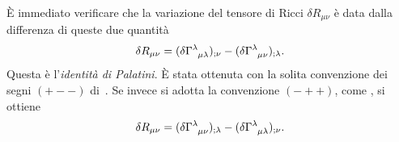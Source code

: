 È immediato verificare che la variazione del tensore di Ricci
$\delta R_{\mu\nu}$ è data dalla differenza di queste due quantità
\begin{equation}
  \delta R_{\mu\nu} = (\delta \tensor{\Gamma}{^{\lambda}_{\mu\lambda}})_{;\nu}
  - (\delta \tensor{\Gamma}{^{\lambda}_{\mu\nu}})_{;\lambda}.
\end{equation}
Questa è l'\emph{identità di Palatini}.  È stata
ottenuta con la solita convenzione dei segni $(+--)$
di~\textcite{weinberg:gravitation}.  Se invece si adotta la convenzione $(-++)$,
come \textcites{barone:relativita,landau:campi}, si ottiene
\begin{equation}
  \delta R_{\mu\nu} = (\delta \tensor{\Gamma}{^{\lambda}_{\mu\nu}})_{;\lambda} -
  (\delta \tensor{\Gamma}{^{\lambda}_{\mu\lambda}})_{;\nu}.
\end{equation}

